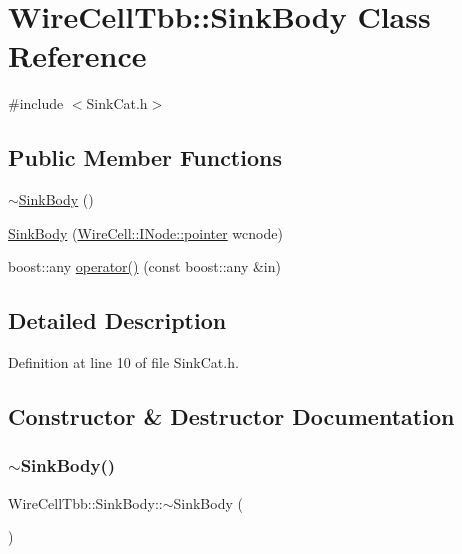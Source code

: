 \hypertarget{class_wire_cell_tbb_1_1_sink_body}{}\section{Wire\+Cell\+Tbb\+:\+:Sink\+Body Class Reference}
\label{class_wire_cell_tbb_1_1_sink_body}


{\ttfamily \#include $<$Sink\+Cat.\+h$>$}

\subsection*{Public Member Functions}
\begin{DoxyCompactItemize}
\item 
\hyperlink{class_wire_cell_tbb_1_1_sink_body_a1657a19eeb718d9ec5248252dec3f17c}{$\sim$\+Sink\+Body} ()
\item 
\hyperlink{class_wire_cell_tbb_1_1_sink_body_aaddb40ec73e6b470ce2de4ea58ca1955}{Sink\+Body} (\hyperlink{class_wire_cell_1_1_interface_a09c548fb8266cfa39afb2e74a4615c37}{Wire\+Cell\+::\+I\+Node\+::pointer} wcnode)
\item 
boost\+::any \hyperlink{class_wire_cell_tbb_1_1_sink_body_a275aad75719e18516c11138529682d65}{operator()} (const boost\+::any \&in)
\end{DoxyCompactItemize}


\subsection{Detailed Description}


Definition at line 10 of file Sink\+Cat.\+h.



\subsection{Constructor \& Destructor Documentation}
\mbox{\label{class_wire_cell_tbb_1_1_sink_body_a1657a19eeb718d9ec5248252dec3f17c}} 
\subsubsection{\texorpdfstring{$\sim$\+Sink\+Body()}{~SinkBody()}}
{\footnotesize\ttfamily Wire\+Cell\+Tbb\+::\+Sink\+Body\+::$\sim$\+Sink\+Body (\begin{DoxyParamCaption}{ }\end{DoxyParamCaption})\hspace{0.3cm}{\ttfamily [inline]}}



